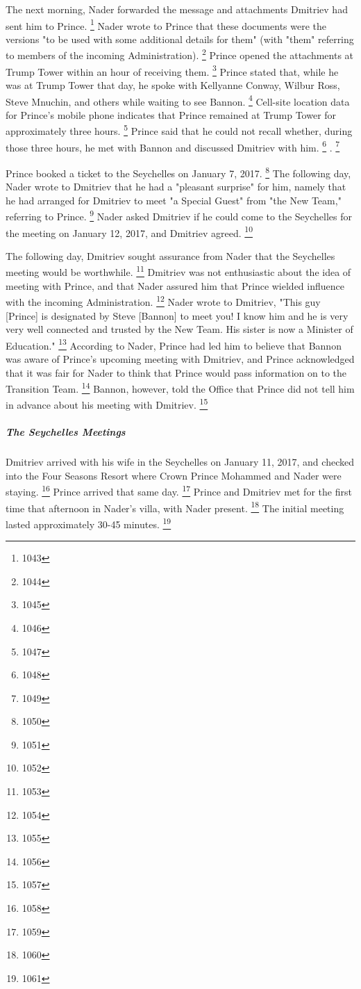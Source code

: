 The next morning, Nader forwarded the message and attachments Dmitriev had sent him to Prince.%
\footnote{1043}
Nader wrote to Prince that these documents were the versions "to be used with some additional details for them" (with "them" referring to members of the incoming Administration).%
\footnote{1044}
Prince opened the attachments at Trump Tower within an hour of receiving them.%
\footnote{1045}
Prince stated that, while he was at Trump Tower that day, he spoke with Kellyanne Conway, Wilbur Ross, Steve Mnuchin, and others while waiting to see Bannon.%
\footnote{1046}
Cell-site location data for Prince's mobile phone indicates that Prince remained at Trump Tower for approximately three hours.%
\footnote{1047}
Prince said that he could not recall whether, during those three hours, he met with Bannon and discussed Dmitriev with him.%
\footnote{1048}
.%
\footnote{1049}

Prince booked a ticket to the Seychelles on January 7, 2017.%
\footnote{1050}
The following day, Nader wrote to Dmitriev that he had a "pleasant surprise" for him, namely that he had arranged for Dmitriev to meet "a Special Guest" from "the New Team," referring to Prince.%
\footnote{1051}
Nader asked Dmitriev if he could come to the Seychelles for the meeting on January 12, 2017, and Dmitriev agreed.%
\footnote{1052}

The following day, Dmitriev sought assurance from Nader that the Seychelles meeting would be worthwhile.%
\footnote{1053}
Dmitriev was not enthusiastic about the idea of meeting with Prince, and that Nader assured him that Prince wielded influence with the incoming Administration.%
\footnote{1054}
Nader wrote to Dmitriev, "This guy [Prince] is designated by Steve [Bannon] to meet you!
I know him and he is very very well connected and trusted by the New Team.
His sister is now a Minister of Education."%
\footnote{1055}
According to Nader, Prince had led him to believe that Bannon was aware of Prince's upcoming meeting with Dmitriev, and Prince acknowledged that it was fair for Nader to think that Prince would pass information on to the Transition Team.%
\footnote{1056}
Bannon, however, told the Office that Prince did not tell him in advance about his meeting with Dmitriev.%
\footnote{1057}

\subparagraph{The Seychelles Meetings}

Dmitriev arrived with his wife in the Seychelles on January 11, 2017, and checked into the Four Seasons Resort where Crown Prince Mohammed and Nader were staying.%
\footnote{1058}
Prince arrived that same day.%
\footnote{1059}
Prince and Dmitriev met for the first time that afternoon in Nader's villa, with Nader present.%
\footnote{1060}
The initial meeting lasted approximately 30-45 minutes.%
\footnote{1061}


